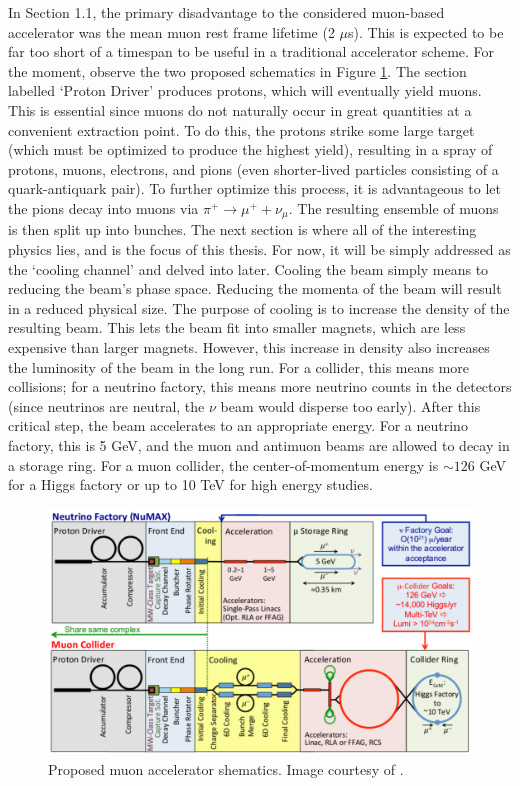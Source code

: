 In Section 1.1, the primary disadvantage to the considered muon-based accelerator was the mean muon rest frame lifetime (2 $\mu$s). This is expected to be far too short of a timespan to be useful in a traditional accelerator scheme. For the moment, observe the two proposed schematics in Figure \ref{fig:muon_accelerator_schematic}\cite{map}. The section labelled `Proton Driver' produces protons, which will eventually yield muons. This is essential since muons do not naturally occur in great quantities at a convenient extraction point. To do this, the protons strike some large target (which must be optimized to produce the highest yield), resulting in a spray of protons, muons, electrons, and pions (even shorter-lived particles consisting of a quark-antiquark pair). To further optimize this process, it is advantageous to let the pions decay into muons via $\pi^+ \rightarrow \mu^+ + \nu_\mu$. The resulting ensemble of muons is then split up into bunches. The next section is where all of the interesting physics lies, and is the focus of this thesis. For now, it will be simply addressed as the `cooling channel' and delved into later. Cooling the beam simply means to reducing the beam's phase space. Reducing the momenta of the beam will result in a reduced physical size. The purpose of cooling is to increase the density of the resulting beam. This lets the beam fit into smaller magnets, which are less expensive than larger magnets. However, this increase in density also increases the luminosity of the beam in the long run. For a collider, this means more collisions; for a neutrino factory, this means more neutrino counts in the detectors (since neutrinos are neutral, the $\nu$ beam would disperse too early). After this critical step, the beam accelerates to an appropriate energy. For a neutrino factory, this is 5 GeV, and the muon and antimuon beams are allowed to decay in a storage ring. For a muon collider, the center-of-momentum energy is $\sim 126$ GeV for a Higgs factory or up to 10 TeV for high energy studies.

\begin{figure}
  \centering
    \includegraphics[width=\textwidth]{Figures/muon_accelerator_schematic} 
  \caption{Proposed muon accelerator shematics. Image courtesy of \cite{map}.}
  \label{fig:muon_accelerator_schematic}
\end{figure}


